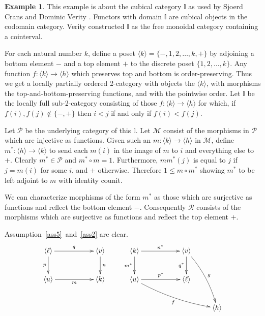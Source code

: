 \documentclass[a4paper,12pt,reqno]{amsart}
\theoremstyle{definition}
\newtheorem{example}[theorem]{Example}
\theoremstyle{fact}
\theoremstyle{genquest}
\theoremstyle{step}
\newcommand{\ra}{\rightarrow}
\def\CM{{\mathscr M}}
\def\CP{{\mathscr P}}
\def\CR{{\mathscr R}}
\begin{document}
\begin{example}\label{Ex3+} This example is about the cubical category $\mathbb{I}$ as used by Sjoerd Crans \cite{CransThesis} and Dominic Verity \cite{LDTHOC, Verity07}. 
Functors with domain $\mathbb{I}$ are cubical objects in the codomain category. 
Verity constructed $\mathbb{I}$ as the free monoidal category containing a cointerval.

For each natural number $k$, define a poset $\langle k\rangle = \{-,1,2,\dots ,k,+\}$ 
by adjoining a bottom element $-$ and a top element $+$ to the discrete poset $\{1,2,\dots ,k\}$.
Any function $f : \langle k\rangle \ra \langle h\rangle$ which preserves top and bottom is order-preserving.
Thus we get a locally partially ordered 2-category with objects the $\langle k\rangle$, 
with morphisms the top-and-bottom-preserving functions, and with the pointwise order. 
Let $\mathbb{I}$ be the locally full sub-2-category
consisting of those $f:\langle k\rangle \ra \langle h\rangle$ for which,
if $f(i),f(j)\notin \{-,+\}$ then $i<j$ if and only if $f(i)<f(j)$. 

Let $\CP$ be the underlying category of this $\mathbb{I}$.
Let $\CM$ consist of the morphisms in $\CP$ which are injective as functions. 
Given such an $m : \langle k\rangle \ra \langle h\rangle$ in $\CM$,
define $m^* : \langle h\rangle \ra \langle k\rangle$ to send each $m(i)$
in the image of $m$ to $i$ and everything else to $+$. 
Clearly $m^*\in \CP$ and $m^*\circ m = 1$.
Furthermore, $mm^*(j)$ is equal to $j$ if $j=m(i)$ for some $i$, and $+$ otherwise.
Therefore $1\le m\circ m^*$ showing $m^*$ to be left adjoint to $m$
with identity counit.

We can characterize morphisms of the form $m^*$ as those which are surjective as functions and reflect the bottom element $-$.
Consequently $\CR$ consists of the morphisms which are surjective as
functions and reflect the top element $+$.

Assumption~\ref{ass5}~and~\ref{ass2} are clear. 
\begin{equation}\label{cubpbpo}
\begin{aligned}
\xymatrix{
\langle \ell \rangle \ar[rr]^-{q} \ar[d]_-{p} &&  \langle v \rangle \ar[d]^-{n} \\
\langle u \rangle \ar[rr]_-{m}  && \langle k \rangle}
\qquad
\xymatrix{
\langle k \rangle \ar[rr]^-{n^*} \ar[d]_-{m^*} && \langle v \rangle \ar[d]_-{q^*} \ar@/^/[ddr]^g \\
\langle u \rangle \ar[rr]^-{p^*} \ar@/_/[drrr]_{f} && \langle \ell \rangle \\
&& & \langle h \rangle }
\end{aligned}
\end{equation}


\end{example}
\end{document}

